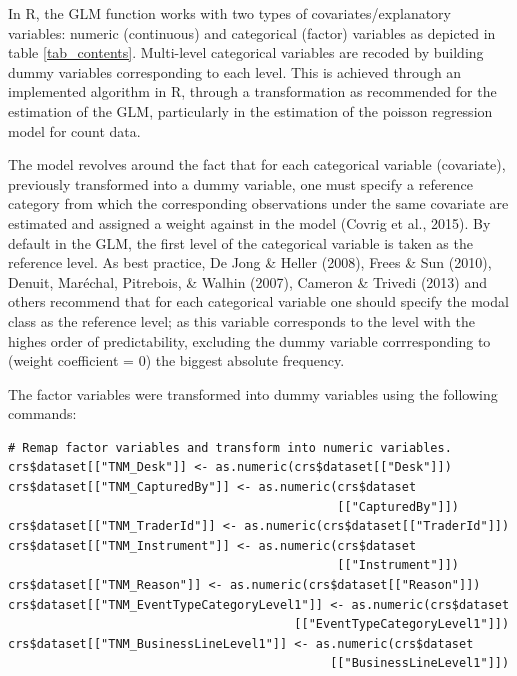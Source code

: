 \documentclass{DissertateUSU}
\begin{document}
In R, the GLM function works with two types of covariates/explanatory
variables: numeric (continuous) and categorical (factor) variables as
depicted in table \ref{tab_contents}. Multi-level categorical variables
are recoded by building dummy variables corresponding to each level.
This is achieved through an implemented algorithm in R, through a
transformation as recommended for the estimation of the GLM,
particularly in the estimation of the poisson regression model for count
data.\medskip

The model revolves around the fact that for each categorical variable
(covariate), previously transformed into a dummy variable, one must
specify a reference category from which the corresponding observations
under the same covariate are estimated and assigned a weight against in
the model (Covrig et al., 2015). By default in the GLM, the first level
of the categorical variable is taken as the reference level. As best
practice, De Jong \& Heller (2008), Frees \& Sun (2010), Denuit,
Maréchal, Pitrebois, \& Walhin (2007), Cameron \& Trivedi (2013) and
others recommend that for each categorical variable one should specify
the modal class as the reference level; as this variable corresponds to
the level with the highes order of predictability, excluding the dummy
variable corrresponding to (weight coefficient = \(0\)) the biggest
absolute frequency.

The factor variables were transformed into dummy variables using the
following commands:

\singlespacing

\begin{verbatim}
# Remap factor variables and transform into numeric variables.
crs$dataset[["TNM_Desk"]] <- as.numeric(crs$dataset[["Desk"]])
crs$dataset[["TNM_CapturedBy"]] <- as.numeric(crs$dataset
                                              [["CapturedBy"]])
crs$dataset[["TNM_TraderId"]] <- as.numeric(crs$dataset[["TraderId"]])
crs$dataset[["TNM_Instrument"]] <- as.numeric(crs$dataset
                                              [["Instrument"]])
crs$dataset[["TNM_Reason"]] <- as.numeric(crs$dataset[["Reason"]])
crs$dataset[["TNM_EventTypeCategoryLevel1"]] <- as.numeric(crs$dataset
                                        [["EventTypeCategoryLevel1"]])
crs$dataset[["TNM_BusinessLineLevel1"]] <- as.numeric(crs$dataset
                                             [["BusinessLineLevel1"]])
\end{verbatim}

\doublespacing
\end{document}
